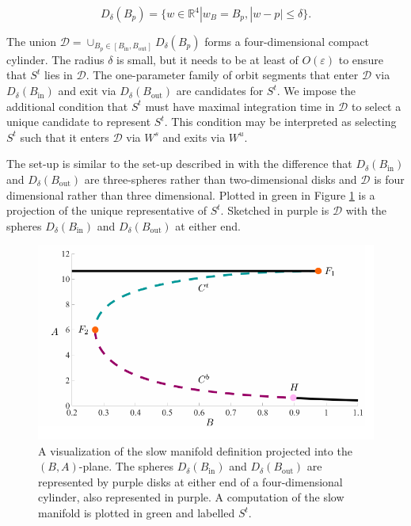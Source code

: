 \documentclass{ws-ijbc}
\begin{document}
\begin{equation*}
D_\delta(B_p)=\{w \in \mathbb{R}^4 | w_B = B_p, |w-p| \leq \delta\}.
\end{equation*}
    
\noindent
The union $\mathscr{D} = \cup_{B_p \in [B_{\mathrm{in}}, B_{\mathrm{out}}]} D_\delta(B_p)$ forms a four-dimensional compact cylinder.  The radius $\delta$ is small, but it needs to be at least of $O(\varepsilon)$ to ensure that $S^t$ lies in $\mathscr{D}$.  The one-parameter family of orbit segments that enter $\mathscr{D}$ via $D_\delta(B_{\mathrm{in}})$ and exit via $D_\delta(B_{\mathrm{out}})$ are candidates for $S^t$.   We impose the additional condition that $S^t$ must have maximal integration time in $\mathscr{D}$ to select a unique candidate to represent $S^t$.  This condition may be interpreted as selecting $S^t$ such that it enters $\mathscr{D}$ via $W^s$ and exits via $W^u$.
    
The set-up is similar to the set-up described in \cite{Saeed_Paper} with the difference that $D_\delta(B_{\mathrm{in}})$ and $D_\delta(B_{\mathrm{out}})$ are three-spheres rather than two-dimensional disks and $\mathscr{D}$ is four dimensional rather than three dimensional.  Plotted in green in Figure \ref{tube_figure} is a projection of the unique representative of $S^t$.  Sketched in purple is $\mathscr{D}$ with the spheres $D_\delta(B_{\mathrm{in}})$ and $D_\delta(B_{\mathrm{out}})$ at either end.

\begin{figure}[!t]
\begin{center}
\includegraphics[page=2, width=\textwidth]{figures.pdf}
\end{center}
\caption{A visualization of the slow manifold definition projected into the $(B,A)$-plane.  The spheres $D_\delta(B_{\mathrm{in}})$ and $D_\delta(B_{\mathrm{out}})$ are represented by purple disks at either end of a four-dimensional cylinder, also represented in purple.  A computation of the slow manifold is plotted in green and labelled $S^t$.}
\label{tube_figure}
\end{figure}
\end{document}
